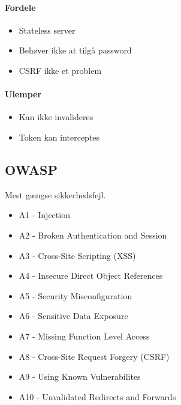 \begin{multicols}{2}

	\paragraph{Fordele}

	\begin{itemize}
		\item Stateless server
		\item Behøver ikke at tilgå password
		\item CSRF ikke et problem
	\end{itemize}

	\paragraph{Ulemper}
	
	\begin{itemize}
		\item Kan ikke invalideres
		\item Token kan interceptes
	\end{itemize}

\end{multicols}

\subsection{OWASP}
Mest gængse sikkerhedsfejl.

\begin{multicols}{2}
	\begin{itemize}
		\item A1 - Injection
		\item A2 - Broken Authentication and Session
		\item A3 - Cross-Site Scripting (XSS)
		\item A4 - Insecure Direct Object References
		\item A5 - Security Misconfiguration
		\item A6 - Sensitive Data Exposure
		\item A7 - Missing Function Level Access
		\item A8 - Cross-Site Request Forgery (CSRF)
		\item A9 - Using Known Vulnerabilites
		\item A10 - Unvalidated Redirects and Forwards
	\end{itemize}
\end{multicols}

